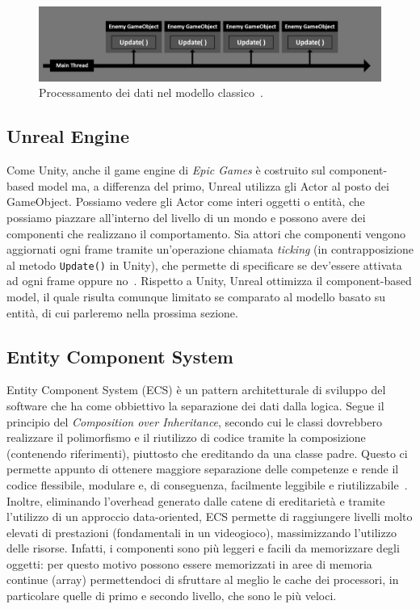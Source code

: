\begin{figure}[!ht]
    \centering
    \includegraphics[width=0.90\columnwidth]{gfx/imgs/chapter1/MainThread.png}
    \caption{Processamento dei dati nel modello classico~\cite{youtube:differenze-unity-classico}.}
    \label{fig:traditional-data-processing}
\end{figure}

\subsection{Unreal Engine}
Come Unity, anche il game engine di \emph{Epic Games} è costruito sul component-based model ma, a differenza del primo, Unreal utilizza gli Actor al posto dei GameObject. Possiamo vedere gli Actor come interi oggetti o entità, che possiamo piazzare all'interno del livello di un mondo e possono avere dei componenti che realizzano il comportamento. Sia attori che componenti vengono aggiornati ogni frame tramite un'operazione chiamata \emph{ticking} (in contrapposizione al metodo \verb|Update()| in Unity), che permette di specificare se dev'essere attivata ad ogni frame oppure no~\cite{doc:unreal-architecture}.
Rispetto a Unity, Unreal ottimizza il component-based model, il quale risulta comunque limitato se comparato al modello basato su entità, di cui parleremo nella prossima sezione.

\subsection{Entity Component System}
Entity Component System (ECS) è un pattern architetturale di sviluppo del software che ha come obbiettivo la separazione dei dati dalla logica. Segue il principio del \emph{Composition over Inheritance}, secondo cui le classi dovrebbero realizzare il polimorfismo e il riutilizzo di codice tramite la composizione (contenendo riferimenti), piuttosto che ereditando da una classe padre. Questo ci permette appunto di ottenere maggiore separazione delle competenze e rende il codice flessibile, modulare e, di conseguenza, facilmente leggibile e riutilizzabile~\cite{article:composition-over-inheritance}. Inoltre, eliminando l'overhead generato dalle catene di ereditarietà e tramite l'utilizzo di un approccio data-oriented, ECS permette di raggiungere livelli molto elevati di prestazioni (fondamentali in un videogioco), massimizzando l'utilizzo delle risorse. Infatti, i componenti sono più leggeri e facili da memorizzare degli oggetti: per questo motivo possono essere memorizzati in aree di memoria continue (array) permettendoci di sfruttare al meglio le cache dei processori, in particolare quelle di primo e secondo livello, che sono le più veloci.

